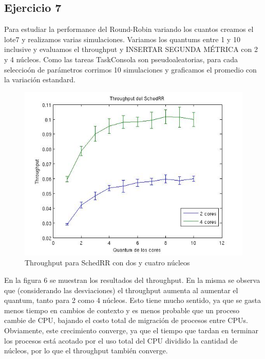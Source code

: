   \subsection{Ejercicio 7}

  Para estudiar la performance del Round-Robin variando los cuantos creamos el lote7 y realizamos varias simulaciones. Variamos los quantums entre 1 y 10 inclusive y evaluamos el throughput y INSERTAR SEGUNDA M\'ETRICA con 2 y 4 n\'ucleos. Como las tareas TaskConsola son pseudoaleatorias,
  para cada seleccio\'on de par\'ametros corrimos 10 simulaciones y graficamos el promedio con la variaci\'on estandard.

  \begin{figure}
  \includegraphics[scale=0.6]{images/TH.jpg}
  \caption{Throughput para SchedRR con dos y cuatro n\'ucleos}
  \end{figure}

  En la figura 6 se muestran los resultados del throughput. En la misma se observa que (considerando las desviaciones) el throughput aumenta al aumentar el quantum, tanto para 2 como 4 n\'ucleos. Esto tiene mucho sentido, ya que se
  gasta menos tiempo en cambios de contexto y es menos probable que un proceso cambie de CPU, bajando el costo total de migraci\'on de procesos entre CPUs. Obviamente, este crecimiento converge, ya que el tiempo que tardan en terminar los procesos est\'a acotado por
  el uso total del CPU dividido la cantidad de n\'ucleos, por lo que el throughput tambi\'en converge.
